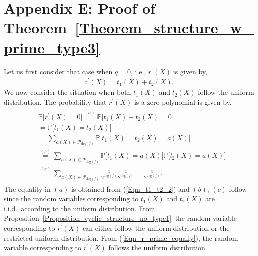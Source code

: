 \documentclass[10pt,journal]{IEEEtran}
\def \deg{{\mathrm{deg}}}
\begin{document}

\section*{Appendix E: Proof of Theorem~\ref{Theorem_structure_w_prime_type3}}
%  

Let us first consider that case when $q=0$, i.e., $r^{\prime}(X)$ is given by,
% 
\begin{align}
%  
r^{\prime}(X) = t_1(X) + t_2(X).
\label{Eqn_t1_t2_2}	      
% 
\end{align}
% 
We now consider the situation when both $t_1(X)$ and $t_2(X)$ follow the uniform distribution.
The probability that $r^{\prime}(X)$ is a zero polynomial is given by,
% 
\begin{eqnarray}
% 
\begin{aligned}
%  
&\mathbb{P} \big[r^{\prime}(X) = 0\big] 
\stackrel{(a)}{=} \mathbb{P} \big[ t_1(X) + t_2(X) = 0\big] \\
& = \mathbb{P} \big[ t_1(X) = t_2(X)\big] \\
& = \sum_{a(X) \in \mathcal{P}_{\deg(f)}} \mathbb{P} \Big[ t_1(X) = t_2(X) = a(X)\Big]\\
& \stackrel{(b)}{=} \sum_{a(X) \in \mathcal{P}_{\deg(f)}} \mathbb{P} \Big[ t_1(X) = a(X)\Big] \mathbb{P} \Big[t_2(X) = a(X)\Big]\\
& \stackrel{(c)}{=} \sum_{a(X) \in \mathcal{P}_{\deg(f)}} \frac{1}{2^{\deg(f)}} \frac{1}{2^{\deg(f)}} 
= \frac{1}{2^{\deg(f)}}.
\label{Eqn_r_prime_equally}
% 
\end{aligned}
% 
\end{eqnarray}
% 
The equality in $(a)$ is obtained from (\ref{Eqn_t1_t2_2}) and $(b)$, $(c)$ follow since the random
variables corresponding to $t_1(X)$ and $t_2(X)$ are i.i.d.~according
to the uniform distribution.
From Proposition~\ref{Proposition_cyclic_structure_no_type1},
the random variable corresponding to $r^{\prime}(X)$ can either follow the uniform distribution or the restricted uniform distribution. 
% 
From (\ref{Eqn_r_prime_equally}), the random variable corresponding to 
$r^{\prime}(X)$ follows the uniform distribution.
\end{document}
